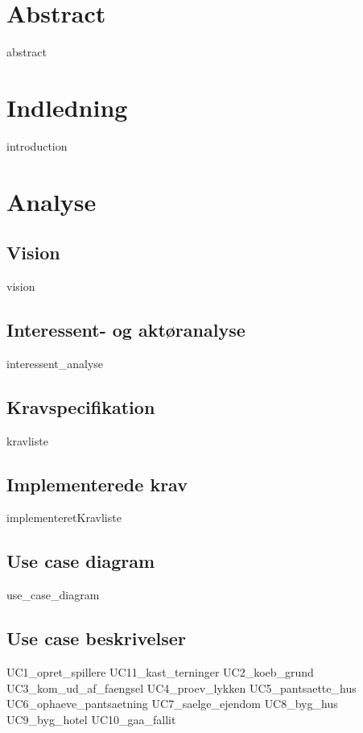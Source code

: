 \documentclass{article}
\begin{document}
{\selectfont

\thispagestyle{empty}
\newpage

\thispagestyle{empty}
\newpage
\section*{Abstract}
{abstract}
\thispagestyle{empty}
\newpage
\tableofcontents
\thispagestyle{empty}
\newpage
\clearpage
\setcounter{page}{1}

\section{Indledning}
{introduction}

\section{Analyse}
\subsection{Vision}
{vision}

\subsection{Interessent- og aktøranalyse}
{interessent_analyse}
\subsection{Kravspecifikation}
{kravliste}
\subsection{Implementerede krav}
{implementeretKravliste}
\newpage
\subsection{Use case diagram}
{use_case_diagram}
\newpage
\subsection{Use case beskrivelser}
{UC1_opret_spillere}
{UC11_kast_terninger}
{UC2_koeb_grund}
{UC3_kom_ud_af_faengsel}
{UC4_proev_lykken}
{UC5_pantsaette_hus}
{UC6_ophaeve_pantsaetning}
{UC7_saelge_ejendom}
{UC8_byg_hus}
{UC9_byg_hotel}
{UC10_gaa_fallit}
\newpage
}
\end{document}
